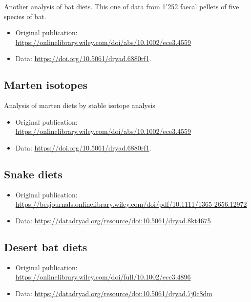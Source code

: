 \documentclass[]{book}
\providecommand{\tightlist}{%
  \setlength{\itemsep}{0pt}\setlength{\parskip}{0pt}}
\begin{document}
Another analysis of bat diets. This one of data from 1'252 faecal pellets of five species of bat.

\begin{itemize}
\tightlist
\item
  Original publication: \url{https://onlinelibrary.wiley.com/doi/abs/10.1002/ece3.4559}
\item
  Data: \url{https://doi.org/10.5061/dryad.6880rf1}.
\end{itemize}

\hypertarget{marten-isotopes}{%
\subsection{Marten isotopes}\label{marten-isotopes}}

Analysis of marten diets by stable isotope analysis

\begin{itemize}
\tightlist
\item
  Original publication: \url{https://onlinelibrary.wiley.com/doi/abs/10.1002/ece3.4559}
\item
  Data: \url{https://doi.org/10.5061/dryad.6880rf1}.
\end{itemize}

\hypertarget{snake-diets}{%
\subsection{Snake diets}\label{snake-diets}}

\begin{itemize}
\tightlist
\item
  Original publication: \url{https://besjournals.onlinelibrary.wiley.com/doi/pdf/10.1111/1365-2656.12972}
\item
  Data: \url{https://datadryad.org/resource/doi:10.5061/dryad.8kt4675}
\end{itemize}

\hypertarget{desert-bat-diets}{%
\subsection{Desert bat diets}\label{desert-bat-diets}}

\begin{itemize}
\tightlist
\item
  Original publication: \url{https://onlinelibrary.wiley.com/doi/full/10.1002/ece3.4896}
\item
  Data: \url{https://datadryad.org/resource/doi:10.5061/dryad.7j0c8dm}
\end{itemize}
\end{document}
